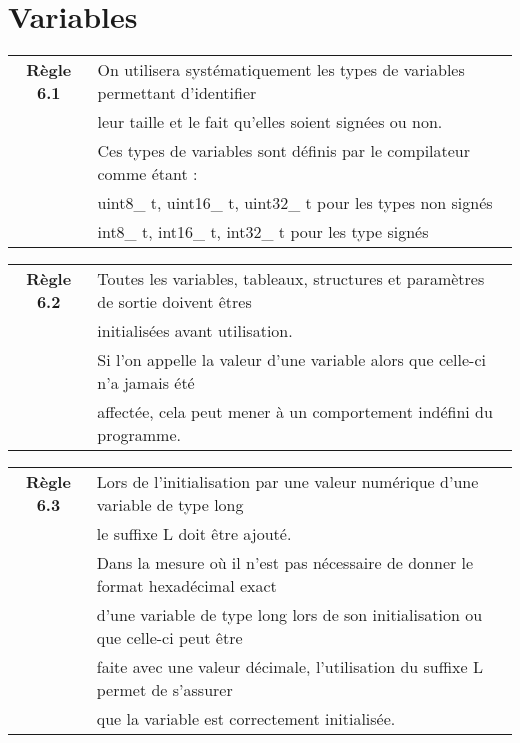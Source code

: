 \section{Variables}

\begin{center}
\begin{tabular}{|c l|}
\hline
\rowcolor{red!10}\textbf{Règle 6.1} & On utilisera systématiquement les types de variables permettant d'identifier \\
\rowcolor{red!10} & leur taille et le fait qu'elles soient signées ou non. \\ \hline
 & Ces types de variables sont définis par le compilateur comme étant : \\
 & uint8\_ t, uint16\_ t, uint32\_ t pour les types non signés \\
 & int8\_ t, int16\_ t, int32\_ t pour les type signés \\ \hline
\hline
\end{tabular}
\end{center}

\medskip

\begin{center}
\begin{tabular}{|c l|}
\hline
\rowcolor{red!10}\textbf{Règle 6.2} & Toutes les variables, tableaux, structures et paramètres de sortie doivent êtres\\
\rowcolor{red!10} & initialisées avant utilisation. \\ \hline
 & Si l’on appelle la valeur d’une variable alors que celle-ci n’a jamais été \\
 & affectée, cela peut mener à un comportement indéfini du programme.\\ \hline
\hline
\end{tabular}
\end{center}

\medskip

\begin{center}
\begin{tabular}{|c l|}
\hline
\rowcolor{red!10}\textbf{Règle 6.3} & Lors de l'initialisation par une valeur numérique d'une variable de type long\\
\rowcolor{red!10} & le suffixe L doit être ajouté. \\ \hline
 & Dans la mesure où il n’est pas nécessaire de donner le format hexadécimal exact \\
 & d’une variable de type long lors de son initialisation ou que celle-ci peut être\\
 & faite avec une valeur décimale, l’utilisation du suffixe L permet de s’assurer \\
 & que la variable est correctement initialisée.\\ \hline
\hline
\end{tabular}
\end{center}

